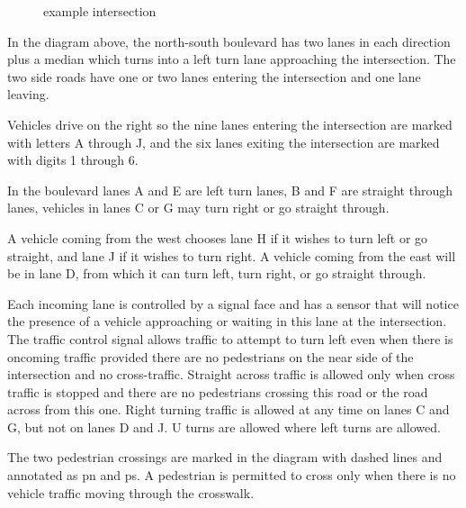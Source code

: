 \documentclass[letterpaper,twoside]{article}
\begin{document}
\begin{figure}[H]
{}
  {\caption{example intersection}}
\end{figure}

In the diagram above, the north-south boulevard has two lanes in each
direction plus a median which turns into a left turn lane approaching
the intersection.  The two side roads have one or two lanes entering
the intersection and one lane leaving.

Vehicles drive on the right so the nine lanes entering the intersection are
marked with letters A through J, and the six lanes exiting the intersection are
marked with digits 1 through 6.

In the boulevard lanes A and E are left turn lanes, B and F are straight
through lanes, vehicles in lanes C or G may turn right or go straight through.

A vehicle coming from the west chooses lane H if it wishes to turn left
or go straight, and lane J if it wishes to turn right.
A vehicle coming from the east will be in lane D, from which it can turn
left, turn right, or go straight through.

Each incoming lane is controlled by a signal face and has a sensor that will
notice the presence of a vehicle approaching or waiting in this lane
at the intersection.
The traffic control signal allows traffic to attempt to turn left even
when there is oncoming traffic provided there are no pedestrians on the near
side of the intersection and no cross-traffic.
Straight across traffic is allowed only when
cross traffic is stopped and there are no pedestrians crossing this road
or the road across from this one.
Right turning traffic is allowed at any time on lanes C and G, but not
on lanes D and J.  U turns are allowed where left turns are allowed.

The two pedestrian crossings are marked in the diagram with dashed lines
and annotated as pn and ps.
A pedestrian is permitted to cross only when there is no vehicle traffic
moving through the crosswalk.
\end{document}
